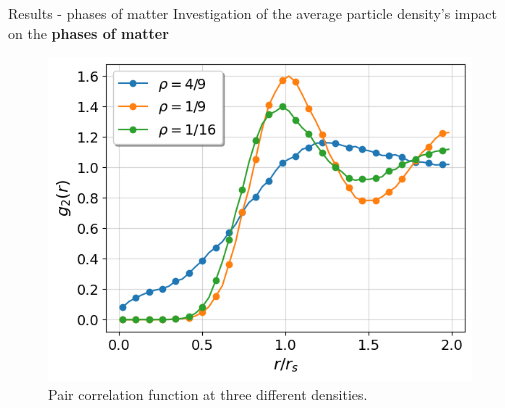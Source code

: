 \documentclass{beamer}
\begin{document}
\begin{frame}{Results - phases of matter}
Investigation of the average particle density's impact on the \textbf{phases of matter}
\begin{figure}
\centering
\includegraphics[scale=0.5]{figures/corr_func_diff_densities.png}
\caption{Pair correlation function at three different densities.}
\end{figure}
\end{frame}
\end{document}
